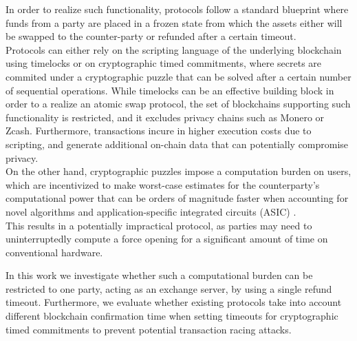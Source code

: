 \documentclass{article}      	%
\begin{document}
In order to realize such functionality, protocols follow a standard blueprint where funds from a party are placed in a frozen state from which the assets either will be swapped to the counter-party or refunded after a certain timeout. \\
Protocols can either rely on the scripting language of the underlying blockchain using timelocks or on cryptographic timed commitments, where secrets are commited under a cryptographic puzzle that can be solved after a certain number of sequential operations. 
While timelocks can be an effective building block in order to a realize an atomic swap protocol, the set of blockchains supporting such functionality is restricted, and it excludes privacy chains such as Monero or Zcash. Furthermore, transactions incure in higher execution costs due to scripting, and generate additional on-chain data that can potentially compromise privacy. \\
On the other hand, cryptographic puzzles impose a computation burden on users, which are incentivized to make worst-case estimates for the counterparty's computational power that can be orders of magnitude faster when accounting for novel algorithms \cite{squaring_algo} and application-specific integrated circuits (ASIC) \cite{squaring_asic}. \\
This results in a potentially impractical protocol, as parties may need to uninterruptedly compute a force opening for a significant amount of time on conventional hardware.

In this work we investigate whether such a computational burden can be restricted to one party, acting as an exchange server, by using a single refund timeout. Furthermore, we evaluate whether existing protocols take into account different blockchain confirmation time when setting timeouts for cryptographic timed commitments to prevent potential transaction racing attacks.
\end{document}

